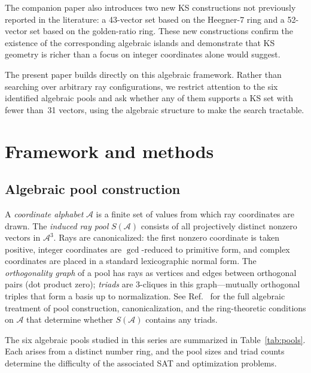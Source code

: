 \documentclass[twocolumn,pra,superscriptaddress,nofootinbib]{revtex4-2}
\begin{document}
The companion paper also introduces two new KS constructions not previously
reported in the literature: a 43-vector set based on the Heegner-7 ring and a
52-vector set based on the golden-ratio ring.  These new constructions confirm
the existence of the corresponding algebraic islands and demonstrate that KS
geometry is richer than a focus on integer coordinates alone would suggest.

The present paper builds directly on this algebraic framework.  Rather than
searching over arbitrary ray configurations, we restrict attention to the six
identified algebraic pools and ask whether any of them supports a KS set with
fewer than~31 vectors, using the algebraic structure to make the search tractable.

\section{Framework and methods}
\label{sec:methods}

\subsection{Algebraic pool construction}

A \emph{coordinate alphabet} $\mathcal{A}$ is a finite set of values from which ray
coordinates are drawn. The \emph{induced ray pool} $S(\mathcal{A})$ consists of all
projectively distinct nonzero vectors in $\mathcal{A}^3$. Rays are canonicalized: the
first nonzero coordinate is taken positive, integer coordinates are $\gcd$-reduced to
primitive form, and complex coordinates are placed in a standard lexicographic normal
form. The \emph{orthogonality graph} of a pool has rays as vertices and edges between
orthogonal pairs (dot product zero); \emph{triads} are 3-cliques in this graph---mutually
orthogonal triples that form a basis up to normalization. See
Ref.~\cite{Kernaghan2026algebraic} for the full algebraic treatment of pool construction,
canonicalization, and the ring-theoretic conditions on $\mathcal{A}$ that determine
whether $S(\mathcal{A})$ contains any triads.

The six algebraic pools studied in this series are summarized in
Table~\ref{tab:pools}. Each arises from a distinct number ring, and the pool sizes
and triad counts determine the difficulty of the associated SAT and optimization
problems.
\end{document}

